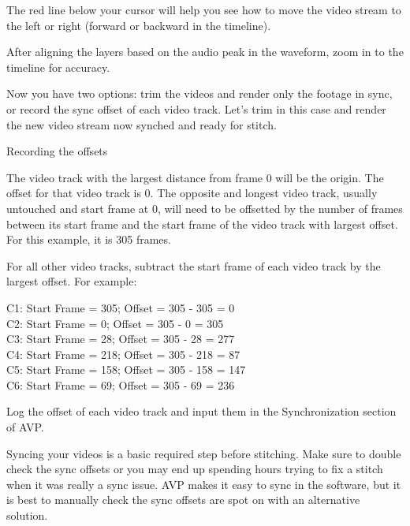 \begin{fullwidth}

The red line below your cursor will help you see how to move the video stream to the left or right (forward or backward in the timeline). 

After aligning the layers based on the audio peak in the waveform, zoom in to the timeline for accuracy.


Now you have two options: trim the videos and render only the footage in sync, or record the sync offset of each video track. Let’s trim in this case and render the new video stream now synched and ready for stitch.


\clearpage
{\large Recording the offsets \par}

The video track with the largest distance from frame 0 will be the origin. The offset for that video track is 0. The opposite and longest video track, usually untouched and start frame at 0, will need to be offsetted by the number of frames between its start frame and the start frame of the video track with largest offset. For this example, it is 305 frames.


For all other video tracks, subtract the start frame of each video track by the largest offset. For example: 

C1: Start Frame = 305; Offset = 305 - 305 = 0
\\
C2: Start Frame = 0; Offset = 305 - 0 = 305
\\
C3: Start Frame = 28; Offset = 305 - 28 = 277
\\
C4: Start Frame = 218; Offset = 305 - 218 = 87
\\
C5: Start Frame = 158; Offset = 305 - 158 = 147
\\
C6: Start Frame = 69; Offset = 305 - 69 = 236

Log the offset of each video track and input them in the Synchronization section of AVP.

Syncing your videos is a basic required step before stitching. Make sure to double check the sync offsets or you may end up spending hours trying to fix a stitch when it was really a sync issue. AVP makes it easy to sync in the software, but it is best to manually check the sync offsets are spot on with an alternative solution.


\clearpage
\end{fullwidth}